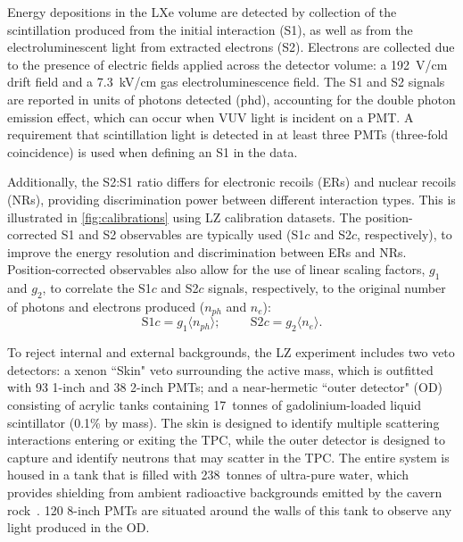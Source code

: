 \documentclass[reprint, showpacs,
preprintnumbers,
amsmath,amssymb,
aps, floatfix,
superscriptaddress,
prd, nofootinbib]{revtex4-1}
\begin{document}
Energy depositions in the LXe volume are detected by collection of the scintillation produced from the initial interaction (S1), as well as from the electroluminescent light from extracted electrons (S2).
Electrons are collected due to the presence of electric fields applied across the detector volume: a 192~V/cm drift field and a 7.3~kV/cm gas electroluminescence field. 
The S1 and S2 signals are reported in units of photons detected (phd), accounting for the double photon emission effect, which can occur when VUV light is incident on a PMT. A requirement that scintillation light is detected in at least three PMTs (three-fold coincidence) is used when defining an S1 in the data.
\par
Additionally, the S2:S1 ratio differs for electronic recoils (ERs) and nuclear recoils (NRs), providing discrimination power between different interaction types.
This is illustrated in \autoref{fig:calibrations} using LZ calibration datasets.
The position-corrected S1 and S2 observables are typically used (S1$c$ and S2$c$, respectively),  to improve the energy resolution and discrimination between ERs and NRs. 
Position-corrected observables also allow for the use of linear scaling factors, $g_1$ and $g_2$, to correlate the S1$c$ and S2$c$ signals, respectively, to the original number of photons and electrons produced ($n_{ph}$ and $n_e$): 
\begin{equation}
    \text{S1}c = g_1\langle n_{ph} \rangle; \hspace{1cm} \text{S2}c = g_2 \langle n_e \rangle. 
\label{eq:S1S2scale}
\end{equation}
\par
To reject internal and external backgrounds, the LZ experiment includes two veto detectors: a xenon ``Skin" veto surrounding the active mass, which is outfitted with 93 1-inch and 38 2-inch PMTs; and a near-hermetic ``outer detector" (OD) consisting of acrylic tanks containing 17~tonnes of gadolinium-loaded liquid scintillator (0.1\% by mass). 
The skin is designed to identify multiple scattering interactions entering or exiting the TPC, while the outer detector is designed to capture and identify neutrons that may scatter in the TPC. 
The entire system is housed in a tank that is filled with 238~tonnes of ultra-pure water, which provides shielding from ambient radioactive backgrounds emitted by the cavern rock~\cite{LZ:Experiment_2020, LZ:TDR_2017}.
120 8-inch PMTs are situated around the walls of this tank to observe any light produced in the OD.
\par
\end{document}

